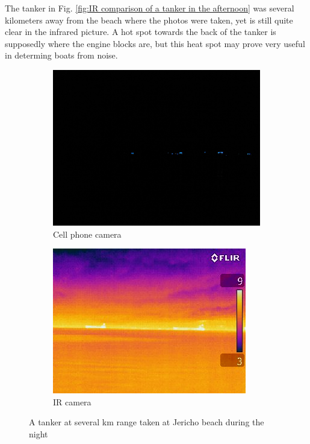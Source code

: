 The tanker in Fig. \ref{fig:IR comparison of a tanker in the afternoon} was several kilometers away from the beach where the photos were taken, yet is still quite clear in the infrared picture. A hot spot towards the back of the tanker is supposedly where the engine blocks are, but this heat spot may prove very useful in determing boats from noise.

\begin{figure}
\centering
\begin{subfigure}{.5\textwidth}
  \centering
  \includegraphics[width=.8\linewidth]{"./image/jericho-night-tankers-visible"}
  \caption{Cell phone camera}
  \label{fig:sub1}
\end{subfigure}%
\begin{subfigure}{.5\textwidth}
  \centering
  \includegraphics[width=.8\linewidth]{"./image/jericho-night-tankers-ir"}
  \caption{IR camera}
  \label{fig:sub2}
\end{subfigure}
\caption{A tanker at several km range taken at Jericho beach during the night}
\label{fig:IR comparison of a tanker at night}
\end{figure}

